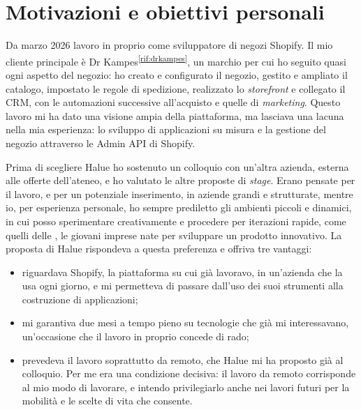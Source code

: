 \section{Motivazioni e obiettivi personali}
\label{sec:obiettivi-personali}

Da marzo 2026 lavoro in proprio come sviluppatore di negozi Shopify. Il mio cliente principale è
Dr Kampes\textsuperscript{\ref{rif:drkampes}}, un marchio per cui ho seguito quasi ogni aspetto del
negozio: ho creato e configurato il negozio, gestito e ampliato il catalogo, impostato le regole di
spedizione, realizzato lo \emph{storefront} e collegato il CRM, con le automazioni successive
all’acquisto e quelle di \emph{marketing}. Questo lavoro mi ha dato una visione ampia della
piattaforma, ma lasciava una lacuna nella mia esperienza: lo sviluppo di applicazioni su misura e
la gestione del negozio attraverso le Admin API di Shopify.

Prima di scegliere Halue ho sostenuto un colloquio con un’altra azienda, esterna alle offerte
dell’ateneo, e ho valutato le altre proposte di \emph{stage}. Erano pensate per il lavoro, e per un
potenziale inserimento, in aziende grandi e strutturate, mentre io, per esperienza personale, ho
sempre prediletto gli ambienti piccoli e dinamici, in cui posso sperimentare creativamente e
procedere per iterazioni rapide, come quelli delle , le giovani imprese
nate per sviluppare un prodotto innovativo. La proposta di Halue rispondeva a questa preferenza e offriva tre
vantaggi:

\begin{itemize}
	\item riguardava Shopify, la piattaforma su cui già lavoravo, in un’azienda che la usa ogni
	giorno, e mi permetteva di passare dall’uso dei suoi strumenti alla costruzione di applicazioni;
	\item mi garantiva due mesi a tempo pieno su tecnologie che già mi interessavano, un’occasione
	che il lavoro in proprio concede di rado;
	\item prevedeva il lavoro soprattutto da remoto, che Halue mi ha proposto già al colloquio. Per
	me era una condizione decisiva: il lavoro da remoto corrisponde al mio modo di lavorare, e intendo
	privilegiarlo anche nei lavori futuri per la mobilità e le scelte di vita che consente.
\end{itemize}

